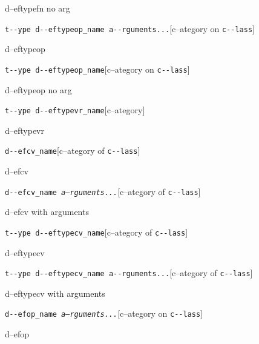 \documentclass{book}
\begin{document}
\begin{titlepage}
%
d--eftypefn no arg

\noindent\texttt{t{-}{-}ype d{-}{-}eftypeop\_name a{-}{-}rguments...}\hfill[c--ategory on \texttt{c{-}{-}lass}]



%
d--eftypeop

\noindent\texttt{t{-}{-}ype d{-}{-}eftypeop\_name}\hfill[c--ategory on \texttt{c{-}{-}lass}]



%
d--eftypeop no arg

\noindent\texttt{t{-}{-}ype d{-}{-}eftypevr\_name}\hfill[c--ategory]



%
d--eftypevr

\noindent\texttt{d{-}{-}efcv\_name}\hfill[c--ategory of \texttt{c{-}{-}lass}]



%
d--efcv

\noindent\texttt{d{-}{-}efcv\_name \EmbracOn{}\textnormal{\textsl{a--rguments...}}\EmbracOff{}}\hfill[c--ategory of \texttt{c{-}{-}lass}]



%
d--efcv with arguments

\noindent\texttt{t{-}{-}ype d{-}{-}eftypecv\_name}\hfill[c--ategory of \texttt{c{-}{-}lass}]



%
d--eftypecv

\noindent\texttt{t{-}{-}ype d{-}{-}eftypecv\_name a{-}{-}rguments...}\hfill[c--ategory of \texttt{c{-}{-}lass}]



%
d--eftypecv with arguments

\noindent\texttt{d{-}{-}efop\_name \EmbracOn{}\textnormal{\textsl{a--rguments...}}\EmbracOff{}}\hfill[c--ategory on \texttt{c{-}{-}lass}]



%
d--efop


\end{titlepage}
\end{document}

